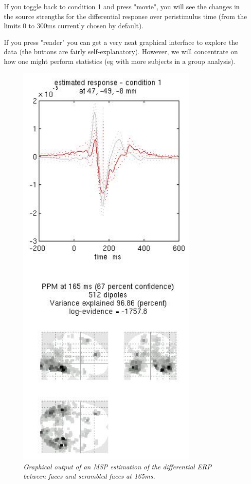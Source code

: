 If you toggle back to condition 1 and press "movie", you will see the changes in the source strengths for the differential response over peristimulus time (from the limits 0 to 300ms currently chosen by default).

If you press "render" you can get a very neat graphical interface to explore the data (the buttons are fairly self-explanatory). However, we will concentrate on how one might perform statistics (eg with more subjects in a group analysis).


\begin{figure}
\begin{center}
\includegraphics[width=90mm]{multimodal/figures/figure_32_9}
\caption{\em Graphical output of an MSP estimation of the differential ERP between faces and scrambled faces at 165ms. \label{fig_32_9}}
\end{center}
\end{figure}

